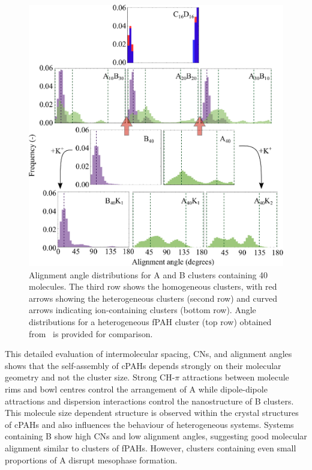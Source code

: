 \begin{figure}[!tbh]
\centering
\includegraphics[width=0.85\linewidth]{Figures/alignment_angles_hetero.eps}
\caption{Alignment angle distributions for A and B clusters containing 40 molecules. The third row shows the homogeneous clusters, with red arrows showing the heterogeneous clusters (second row) and curved arrows indicating ion-containing clusters (bottom row). Angle distributions for a heterogeneous fPAH cluster (top row) obtained from~\citet{bowal2018partitioning} is provided for comparison.}
\label{fig:alignmentangles_hetero}
\end{figure}
%

This detailed evaluation of intermolecular spacing, CNs, and alignment angles shows that the self-assembly of cPAHs depends strongly on their molecular geometry and not the cluster size. Strong CH-$\pi$ attractions between molecule rims and bowl centres control the arrangement of A while dipole-dipole attractions and dispersion interactions control the nanostructure of B clusters. This molecule size dependent structure is observed within the crystal structures of cPAHs and also influences the behaviour of heterogeneous systems. Systems containing B show high CNs and low alignment angles, suggesting good molecular alignment similar to clusters of fPAHs. However, clusters containing even small proportions of A disrupt mesophase formation.

